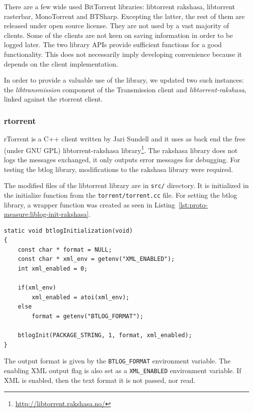 There are a few wide used BitTorrent libraries: libtorrent rakshasa,
libtorrent rasterbar, MonoTorrent and BTSharp. Excepting the latter, the rest
of them are released under open source license. They are not used by a vast
majority of clients. Some of the clients are not keen on saving information in
order to be logged later. The two library APIs provide sufficient functions
for a good functionality. This does not necessarily imply developing
convenience because it depends on the client implementation.

In order to provide a valuable use of the library, we updated two such
instances: the \textit{libtransmission} component of the Transmission client
and \textit{libtorrent-rakshasa}, linked against the rtorrent client.

\subsubsection{rtorrent}

rTorrent is a C++ client written by Jari Sundell and it uses as back end the
free (under GNU GPL) libtorrent-rakshasa
library\footnote{\url{http://libtorrent.rakshasa.no/}}. The rakshasa library does
not logs the messages exchanged, it only outputs error messages for debugging.
For testing the btlog library, modifications to the rakshasa library were
required.

The modified files of the libtorrent library are in \texttt{src/} directory.
It is initialized in the initialize function from the
\texttt{torrent/torrent.cc} file. For setting the btlog library, a wrapper
function was created as seen in
Listing~\ref{lst:proto-measure:liblog-init-rakshasa}.

\lstset{language=C,caption=Initializing Logging Library for
libtorrent-rakshasa,label=lst:proto-measure:liblog-init-rakshasa}
\begin{lstlisting}
static void btlogInitialization(void)
{
    const char * format = NULL;
    const char * xml_env = getenv("XML_ENABLED");
    int xml_enabled = 0;

    if(xml_env)
        xml_enabled = atoi(xml_env);
    else
        format = getenv("BTLOG_FORMAT");

    btlogInit(PACKAGE_STRING, 1, format, xml_enabled);
}
\end{lstlisting}

The output format is given by the \texttt{BTLOG\_FORMAT} environment variable.
The enabling XML output flag is also set as a \texttt{XML\_ENABLED}
environment variable. If XML is enabled, then the text format it is not
passed, nor read.

